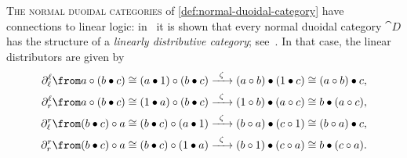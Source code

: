 \textsc{The normal duoidal categories}
of \cref{def:normal-duoidal-category}
have connections to linear logic:
in~\cite[7]{garner16:commut} it is shown that
every normal duoidal category \(\cat{D}\)
has the structure of a \emph{linearly distributive category};
see~\cite{cockett97:weakl}.
In that case, the linear distributors are given by
\begin{equation}\label{eq:normal-duoidal-to-linear-dist}
  \begin{aligned}
    \partial^\ell_\ell \from a \circ (b \bullet c) &\cong (a \bullet 1) \circ (b \bullet c) \xrightarrow{\;\; \zeta \;\;} (a \circ b) \bullet (1 \bullet c) \cong (a \circ b) \bullet c, \\
    \partial^\ell_r \from a \circ (b \bullet c) &\cong (1 \bullet a) \circ (b \bullet c) \xrightarrow{\;\; \zeta \;\;} (1 \circ b) \bullet (a \circ c) \cong b \bullet (a \circ c), \\
    \partial^r_{\ell} \from (b \bullet c) \circ a &\cong (b \bullet c) \circ (a \bullet 1) \xrightarrow{\;\; \zeta \;\;} (b \circ a) \bullet (c \circ 1) \cong (b \circ a) \bullet c, \\
    \partial^r_r \from (b \bullet c) \circ a &\cong (b \bullet c) \circ (1 \bullet a) \xrightarrow{\;\; \zeta \;\;} (b \circ 1) \bullet (c \circ a) \cong b \bullet (c \circ a).
  \end{aligned}
\end{equation}

